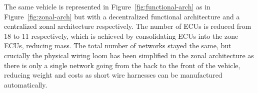 The same vehicle is represented in Figure~\ref{fig:functional-arch} as in Figure~\ref{fig:zonal-arch} but with a decentralized functional architecture and a centralized zonal architecture respectively. The number of ECUs is reduced from 18 to 11 respectively, which is achieved by consolidating ECUs into the zone ECUs, reducing mass. The total number of networks stayed the same, but crucially the physical wiring loom has been simplified in the zonal architecture as there is only a single network going from the back to the front of the vehicle, reducing weight and costs as short wire harnesses can be manufactured automatically.
